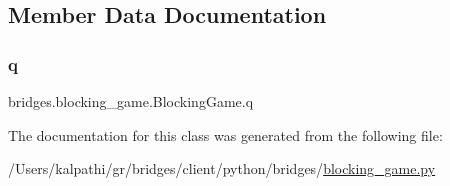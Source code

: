 \subsection{Member Data Documentation}
\mbox{\label{classbridges_1_1blocking__game_1_1_blocking_game_a21d2b164100c6cd61a36f8704c69e51f}} 
\subsubsection{\texorpdfstring{q}{q}}
{\footnotesize\ttfamily bridges.\+blocking\+\_\+game.\+Blocking\+Game.\+q}



The documentation for this class was generated from the following file\+:\begin{DoxyCompactItemize}
\item 
/\+Users/kalpathi/gr/bridges/client/python/bridges/\mbox{\hyperlink{blocking__game_8py}{blocking\+\_\+game.\+py}}\end{DoxyCompactItemize}
